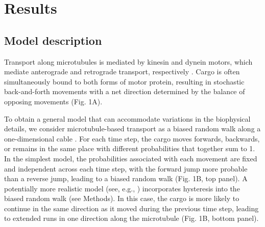 \documentclass[11pt]{wlpeerj}
\begin{document}
\section*{Results}

\subsection*{Model description}

Transport along microtubules is mediated by kinesin and dynein motors, which mediate anterograde and retrograde transport, respectively \citep{Hirokawa_2010,Gagnon_2011}.
Cargo is often simultaneously bound to both forms of motor protein, resulting in stochastic back-and-forth movements with a net direction determined by the balance of opposing movements \citep{Welte2004,Hancock_2014,Buxbaum_2014b} (Fig. 1A).

To obtain a general model that can accommodate variations in the biophysical details, we consider microtubule-based transport as a biased random walk along a one-dimensional cable \citep{Bressloff_2006,Bressloff_2009,Newby_2010,Bressloff_2013}.
For each time step, the cargo moves forwards, backwards, or remains in the same place with different probabilities that together sum to 1.
In the simplest model, the probabilities associated with each movement are fixed and independent across each time step, with the forward jump more probable than a reverse jump, leading to a biased random walk (Fig. 1B, top panel).
A potentially more realistic model (see, e.g., \cite{Muller_2008}) incorporates hysteresis into the biased random walk (see Methods). In this case, the cargo is more likely to continue in the same direction as it moved during the previous time step, leading to extended runs in one direction along the microtubule (Fig. 1B, bottom panel).
\end{document}
